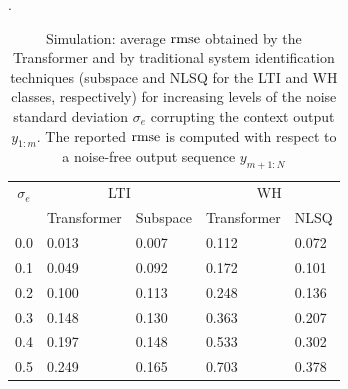 \documentclass{article}
\newcommand{\nsamp}{N}
\begin{document}
\begin{table}
    \centering
    \caption{Simulation: average $\rm rmse$ obtained by the Transformer and by traditional system identification techniques (subspace and NLSQ for the LTI and WH classes, respectively) for increasing levels of the noise standard deviation $\sigma_e$ corrupting the context output 
    $y_{1:m}$.  {The reported $\rm rmse$ is computed with respect to a  noise-free output sequence $y_{m+1:\nsamp}$}}.
    \label{tab:noise_effect}
    \begin{tabular}{c | l | l | l | l}
    \toprule
        $\sigma_e$ & \multicolumn{2}{c|}{LTI} & \multicolumn{2}{c}{WH} \\
        & Transformer & Subspace & Transformer & NLSQ \\
        \midrule
        0.0 & 0.013 & 0.007 & 0.112 & 0.072 \\
        0.1 & 0.049 & 0.092 & 0.172 & 0.101 \\
        0.2 & 0.100 & 0.113 & 0.248 & 0.136 \\
        0.3 & 0.148 & 0.130 & 0.363 & 0.207 \\
        0.4 & 0.197 & 0.148 & 0.533 & 0.302 \\
        0.5 & 0.249 & 0.165 & 0.703 & 0.378 \\
        \bottomrule
    \end{tabular}
\end{table}
\end{document}
